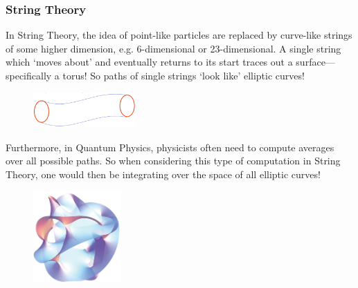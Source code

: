 \begin{frame}[plain] \frametitle{String Theory} \footnotesize
In String Theory, the idea of point-like particles are replaced by curve-like strings of some higher dimension, e.g. 6-dimensional or 23-dimensional. A single string which `moves about' and eventually returns to its start traces out a surface---specifically a torus! So paths of single strings `look like' elliptic curves! 
	\begin{figure}[ht]
	\centering
	\includegraphics[width=0.35\textwidth]{images/stringpath.png}
	\end{figure}
Furthermore, in Quantum Physics, physicists often need to compute averages over all possible paths. So when considering this type of computation in String Theory, one would then be integrating over the space of all elliptic curves!
	\begin{figure}[ht]
	\centering
	\includegraphics[width=0.30\textwidth]{images/calabi-yau.jpeg}
	\end{figure}
\end{frame}



